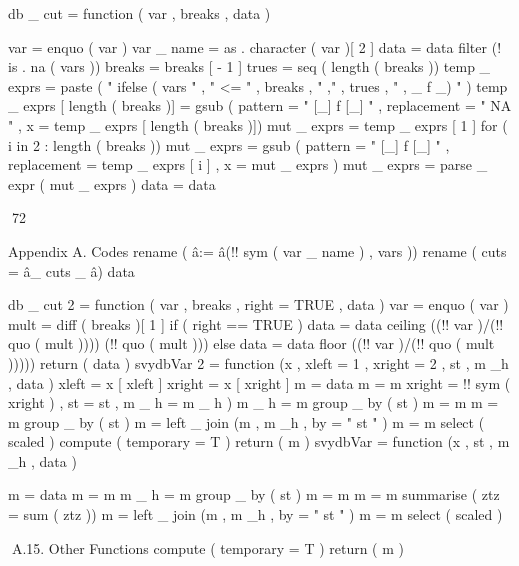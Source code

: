 db _ cut = function ( var , breaks , data ) {
var = enquo ( var )
var _ name = as . character ( var )[ 2 ]
data = data %
filter (! is . na ( vars ))
breaks = breaks [ - 1 ]
trues = seq ( length ( breaks ))
temp _ exprs = paste ( " ifelse ( vars " , " <= " , breaks ,
" ," , trues , " , _ f _) " )
temp _ exprs [ length ( breaks )] = gsub ( pattern = " [_] f [_] " ,
replacement = " NA " , x = temp _ exprs [ length ( breaks )])
mut _ exprs = temp _ exprs [ 1 ]
for ( i in 2 : length ( breaks )) {
mut _ exprs = gsub ( pattern = " [_] f [_] " ,
replacement = temp _ exprs [ i ] , x = mut _ exprs )
}
mut _ exprs = parse _ expr ( mut _ exprs )
data = data %

72

Appendix A. Codes
rename ( â:= â(!! sym ( var _ name ) , vars )) %
rename ( cuts = â_ cuts _ â)
data

}
db _ cut 2 = function ( var , breaks , right = TRUE ,
data ) {
var = enquo ( var )
mult = diff ( breaks )[ 1 ]
if ( right == TRUE ) {
data = data %
ceiling ((!! var )/(!! quo ( mult )))) (!! quo ( mult )))
} else {
data = data %
floor ((!! var )/(!! quo ( mult )))))
}
return ( data )
}
svydbVar 2 = function (x , xleft = 1 , xright = 2 ,
st , m _h , data ) {
xleft = x [ xleft ]
xright = x [ xright ]
m = data
m = m %
xright = !! sym ( xright ) , st = st , m _ h = m _ h )
m _ h = m %
group _ by ( st ) %
m = m %
m = m %
group _ by ( st ) %
m = left _ join (m , m _h , by = " st " )
m = m %
select ( scaled ) %
compute ( temporary = T ) %
return ( m )
}
svydbVar = function (x , st , m _h , data ) {
m = data
m = m %
m _ h = m %
group _ by ( st ) %
m = m %
m = m %
summarise ( ztz = sum ( ztz ))
m = left _ join (m , m _h , by = " st " )
m = m %
select ( scaled ) %

A.15. Other Functions
compute ( temporary = T ) %
return ( m )
}
